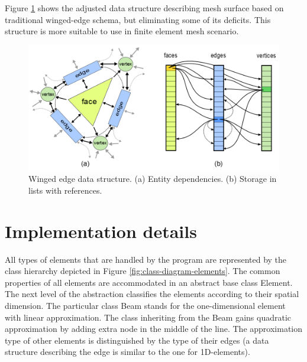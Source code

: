 Figure \ref{fig:winged-edge} shows the adjusted data structure describing mesh surface based on traditional winged-edge schema, but eliminating some of its deficits. This structure is more suitable to use in finite element mesh scenario.

\begin{figure}[H]
\centering
\includegraphics[width=\textwidth]{figures/appendix-mesh-visualization/figure1}
\decoRule
\caption[Winged edge data structure]{Winged edge data structure. (a) Entity dependencies. (b) Storage in lists with references.}
\label{fig:winged-edge}
\end{figure}



\section{Implementation details}
\label{sec:A-implementation}

All types of elements that are handled by the program are represented by the class hierarchy depicted in Figure \ref{fig:class-diagram-elements}. The common properties of all elements are accommodated in an abstract base class Element. The next level of the abstraction classifies the elements according to their spatial dimension. The particular class Beam stands for the one-dimensional element with linear approximation. The class inheriting from the Beam gains quadratic approximation by adding extra node in the middle of the line. The approximation type of other elements is distinguished by the type of their edges (a data structure describing the edge is similar to the one for 1D-elements).

